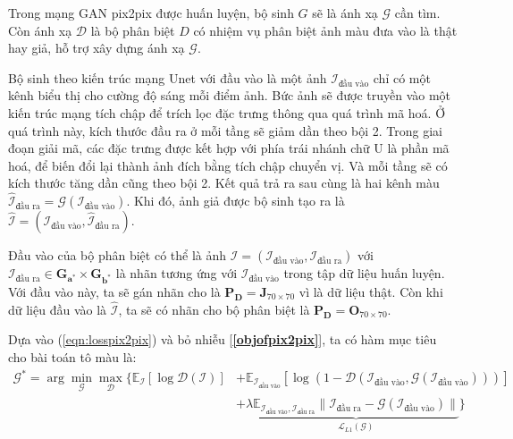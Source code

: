 \documentclass[a4paper, 12pt]{report}
\begin{document}
Trong mạng GAN pix2pix được huấn luyện, bộ sinh $G$ sẽ là ánh xạ $\mathcal{G}$ cần tìm.
Còn ánh xạ $\mathcal{D}$ là bộ phân biệt $D$ có nhiệm vụ phân biệt ảnh màu đưa vào là thật hay giả, hỗ trợ xây dựng ánh xạ $\mathcal{G}$.\vspace{5pt}

Bộ sinh theo kiến trúc mạng Unet với đầu vào là một ảnh $\mathcal{I}_{\text{đầu vào}}$ chỉ có một kênh biểu thị cho cường độ sáng mỗi điểm ảnh.
Bức ảnh sẽ được truyền vào một kiến trúc mạng tích chập để trích lọc đặc trưng thông qua quá trình mã hoá.
Ở quá trình này, kích thước đầu ra ở mỗi tầng sẽ giảm dần theo bội 2.
Trong giai đoạn giải mã, các đặc trưng được kết hợp với phía trái nhánh chữ U là phần mã hoá, để biến đổi lại thành ảnh đích bằng tích chập chuyển vị.
Và mỗi tầng sẽ có kích thước tăng dần cũng theo bội 2.
Kết quả trả ra sau cùng là hai kênh màu $\widehat{\mathcal{I}}_{\text{đầu ra}} = \mathcal{G}\left(\mathcal{I}_{\text{đầu vào}}\right)$.
Khi đó, ảnh giả được bộ sinh tạo ra là $\widehat{\mathcal{I}} = \left(\mathcal{I}_{\text{đầu vào}}, \widehat{\mathcal{I}}_{\text{đầu ra}}\right)$.\vspace{5pt}

Đầu vào của bộ phân biệt có thể là ảnh $\mathcal{I} = \left(\mathcal{I}_{\text{đầu vào}}, \mathcal{I}_{\text{đầu ra}}\right)$ với $\mathcal{I}_{\text{đầu ra}} \in \bm{G}_{\mathbf{a}^*} \times \bm{G}_{\mathbf{b}^*}$ là nhãn tương ứng với $\mathcal{I}_{\text{đầu vào}}$ trong tập dữ liệu huấn luyện.
Với đầu vào này, ta sẽ gán nhãn cho là $\mathbf{P_D} = \mathbf{J}_{70 \times 70}$ vì là dữ liệu thật.
Còn khi dữ liệu đầu vào là $\widehat{\mathcal{I}}$, ta sẽ có nhãn cho bộ phân biệt là $\mathbf{P_D} = \mathbf{O}_{70 \times 70}$.\vspace{5pt}

Dựa vào (\ref{eqn:losspix2pix}) và bỏ nhiễu [\textbf{\ref{objofpix2pix}}], ta có hàm mục tiêu cho bài toán tô màu là:
\begin{align}
    \mathcal{G}^* = \arg\min_{\mathcal{G}}\max_{\mathcal{D}}\bigl\{
    \mathbb{E}_{\mathcal{I}}\left[\log \mathcal{D}\left(\mathcal{I}\right)\right]
    &+ \mathbb{E}_{\mathcal{I}_{\text{đầu vào}}}\left[\log\left(1-\mathcal{D}\left(\mathcal{I}_{\text{đầu vào}}, \mathcal{G}\left(\mathcal{I}_{\text{đầu vào}}\right)\right)\right)\right] \nonumber\\
    &+ \lambda \underbrace{\mathbb{E}_{\mathcal{I}_{\text{đầu vào}}, \mathcal{I}_{\text{đầu ra}}}\lVert \mathcal{I}_{\text{đầu ra}} - \mathcal{G}\left(\mathcal{I}_{\text{đầu vào}}\right)\rVert}_{\mathcal{L}_{L1}\left(\mathcal{G}\right)}\bigr\}\label{eqn:lossofmainmodal}
\end{align}
\end{document}
